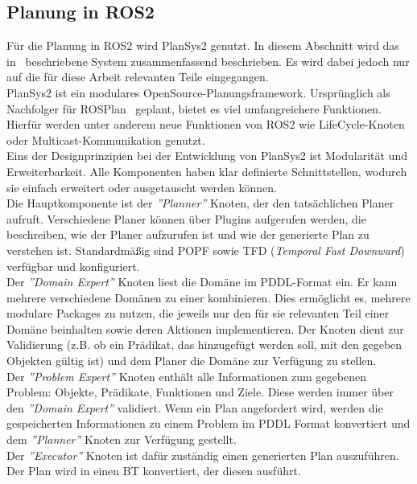 \subsection{Planung in \acs{ROS2}}\label{sec:ros2planning}
Für die Planung in \ac{ROS2} wird \ac{PlanSys2} genutzt.
In diesem Abschnitt wird das in~\cite{plansys} beschriebene System zusammenfassend beschrieben.
Es wird dabei jedoch nur auf die für diese Arbeit relevanten Teile eingegangen.\\
\ac{PlanSys2} ist ein modulares OpenSource-Planungsframework.
Ursprünglich als Nachfolger für ROSPlan~\cite{rosplan} geplant, bietet es viel umfangreichere Funktionen.
Hierfür werden unter anderem neue Funktionen von \ac{ROS2} wie LifeCycle-Knoten oder Multicast-Kommunikation genutzt.\\
Eins der Designprinzipien bei der Entwicklung von \ac{PlanSys2} ist Modularität und Erweiterbarkeit.
Alle Komponenten haben klar definierte Schnittstellen, wodurch sie einfach erweitert oder ausgetauscht werden können.\\
Die Hauptkomponente ist der \emph{''Planner''} Knoten, der den tatsächlichen Planer aufruft.
Verschiedene Planer können über Plugins aufgerufen werden, die beschreiben, wie der Planer aufzurufen ist und wie der generierte Plan zu verstehen ist.
Standardmäßig sind \ac{POPF} sowie TFD (\emph{Temporal Fast Downward})~\cite{tfd} verfügbar und konfiguriert.\\
Der \emph{''Domain Expert''} Knoten liest die Domäne im \ac{PDDL}-Format ein.
Er kann mehrere verschiedene Domänen zu einer kombinieren.
Dies ermöglicht es, mehrere modulare Packages zu nutzen, die jeweils nur den für sie relevanten Teil einer Domäne beinhalten sowie deren Aktionen  implementieren.
Der Knoten dient zur Validierung (z.B. ob ein Prädikat, das hinzugefügt werden soll, mit den gegeben Objekten gültig ist) und dem Planer die Domäne zur Verfügung zu stellen.\\
Der \emph{''Problem Expert''} Knoten enthält alle Informationen zum gegebenen Problem: Objekte, Prädikate, Funktionen und Ziele.
Diese werden immer über den \emph{''Domain Expert''} validiert.
Wenn ein Plan angefordert wird, werden die gespeicherten Informationen zu einem Problem im \ac{PDDL} Format konvertiert und dem \emph{''Planner''} Knoten zur Verfügung gestellt.\\
Der \emph{''Executor''} Knoten ist dafür zuständig einen generierten Plan auszuführen.
Der Plan wird in einen \ac{BT} konvertiert, der diesen ausführt.\\
